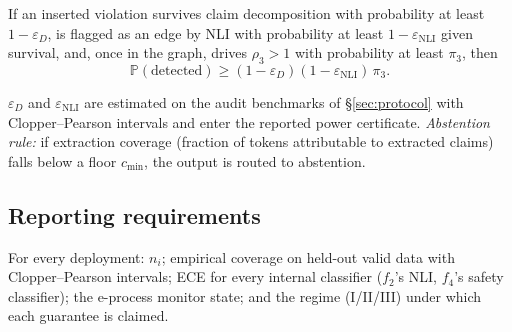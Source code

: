 \begin{proposition}
\label{prop:power}
If an inserted violation survives claim decomposition with probability at
least $1-\varepsilon_D$, is flagged as an edge by NLI with probability at
least $1-\varepsilon_{\mathrm{NLI}}$ given survival, and, once in the graph,
drives $\rho_3>1$ with probability at least $\pi_3$, then
\[
\mathbb P(\text{detected})\ge(1-\varepsilon_D)(1-\varepsilon_{\mathrm{NLI}})\,\pi_3 .
\]
\end{proposition}

$\varepsilon_D$ and $\varepsilon_{\mathrm{NLI}}$ are estimated on the audit
benchmarks of \S\ref{sec:protocol} with Clopper--Pearson intervals and enter
the reported power certificate. \emph{Abstention rule:} if extraction coverage
(fraction of tokens attributable to extracted claims) falls below a floor
$c_{\min}$, the output is routed to abstention.

\subsection{Reporting requirements}
\label{sec:reporting}

For every deployment: $n_i$; empirical coverage on held-out valid data with
Clopper--Pearson intervals; ECE for every internal classifier ($f_2$'s NLI,
$f_4$'s safety classifier); the e-process monitor state; and the regime
(I/II/III) under which each guarantee is claimed.
